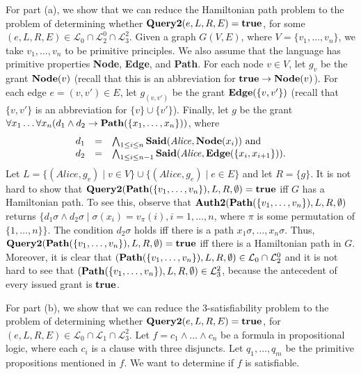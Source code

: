 \documentclass{acmtrans2m}
\newcommand{\<}{
}
\renewcommand{\>}{\rangle}
\newcommand{\union}{\cup}
\newcommand{\inter}{\cap}
\newcommand{\cL}{\mathcal{L}}
\newcommand{\Said}{\mathit{\bf Said}}
\newcommand{\true}{\mathit{\bf{true}}}
\newcommand{\cd}{d}
\newcommand{\cc}{e}
\newcommand{\scc}{E}
\newcommand{\imp}{\rightarrow}
\newcommand{\XProcTwo}{\textbf{Query2}}
\newcommand{\XATwo}{\textbf{Auth2}}
\begin{document}
For part (a), we show that we can reduce the Hamiltonian path problem to the problem of determining whether
$\XProcTwo(\cc,L,R, \scc) = \true$, for some $(\cc, L, R, \scc) \in \cL_0\inter\cL_2^{0}\cap\cL_3^{2}$.  Given a graph $G(V,E)$, where $V = \{v_1, \ldots, v_n\}$, we take $v_1, \ldots, v_n$ to be primitive principles.  We also assume that the language has primitive properties {\bf Node}, {\bf Edge}, and {\bf Path}.  For each node $v \in V$, let $g_v$ be the grant ${\bf Node}(v)$ (recall that this is an abbreviation for $\true \imp {\bf Node}(v)$).  For each edge $e = (v,v') \in E$, let $g_{(v,v')}$ be the grant ${\bf Edge}(\{v,v'\})$ (recall that $\{v,v'\}$ is an abbreviation for $\{v\}\union\{v'\}$).
Finally, let $g$ be the grant $\forall x_1 \ldots \forall x_n (\cd_1\land \cd_2 \imp \mathit{\bf Path}(\{x_1, \ldots,x_n\}))$, where
\[
\begin{array}{lll}
\cd_1 &=& \bigwedge_{1\le i\le n} \Said(\mathit{Alice}, \mathit{\bf Node}(x_i)) \mbox{ and } \\
\cd_2 &=& \bigwedge_{1 \le i\le n-1}\Said(\mathit{Alice},
\mathit{\bf Edge}(\{x_i, x_{i+1}\})).
\end{array}
\]
Let $L = \{(\mathit{Alice}, g_v) \mid v \in V\} \union \{(\mathit{Alice}, g_e) \mid e \in E\}$ and let
$R = \{g\}$.  It is not hard to show that $\XProcTwo(\mathit{\bf Path}(\{v_1, \ldots, v_n\}), L, R, \emptyset) = \true$
iff $G$ has a Hamiltonian path. To see this, observe that $\XATwo(\mathit{\bf Path}(\{v_1, \ldots, v_n\}), L, R, \emptyset)$ returns $\{\cd_1\sigma \land \cd_2\sigma \mid \sigma(x_i) = v_\pi(i), i = 1, \ldots, n$, where $\pi$ is some permutation of $\{1, \ldots, n\}\}$.  The condition $\cd_2\sigma$ holds iff there is a path $x_1\sigma, \ldots, x_n\sigma$.  Thus, $\XProcTwo(\mathit{\bf Path}(\{v_1, \ldots, v_n\}), L, R, \emptyset) = \true$ iff there is a Hamiltonian path in $G$.  Moreover, it is clear that $(\mathit{\bf Path}(\{v_1, \ldots, v_n\}), L, R, \emptyset) \in \cL_0\inter\cL_2^{0}$ and it is not hard to see that $(\mathit{\bf Path}(\{v_1, \ldots, v_n\}), L, R, \emptyset) \in \cL_3^{2}$, because the antecedent of every issued grant is $\true$.

For part (b), we show that we can reduce the 3-satisfiability problem to the problem of determining whether
$\XProcTwo(\cc, L, R, \scc) = \true$, for $(\cc,L,R, \scc)\in \cL_0\inter\cL_1\cap\cL_3^2$.  Let $f = c_1\land\ldots\land c_n$ be a formula in propositional logic, where each $c_i$ is a clause with three disjuncts.  Let $q_1, \ldots, q_m$ be the primitive propositions mentioned in $f$.  We want to determine if $f$ is satisfiable.
\end{document}
